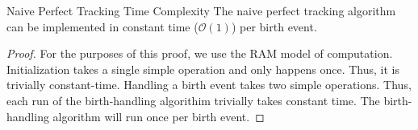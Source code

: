 \begin{theorem}{Naive Perfect Tracking Time Complexity}
\label{thm:perfect-tracking-time}
The naive perfect tracking algorithm can be implemented in constant time ($\mathcal{O}(1)$) per birth event.
\end{theorem}

\begin{proof}
\label{prf:perfect-tracking-time}
For the purposes of this proof, we use the RAM model of computation. 
Initialization takes a single simple operation and only happens once. 
Thus, it is trivially constant-time.
Handling a birth event takes two simple operations.
Thus, each run of the birth-handling algorithim trivially takes constant time.
The birth-handling algorithm will run once per birth event.
\end{proof}

